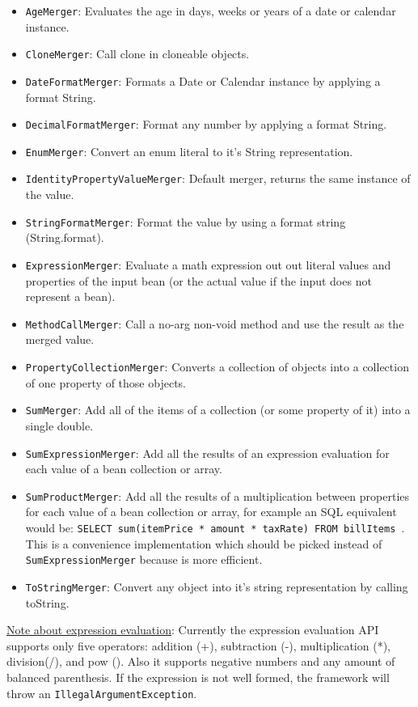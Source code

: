 \documentclass[11pt]{article}
\begin{document}
\begin{itemize}
 \item \texttt{AgeMerger}: Evaluates the age in days, weeks or years of a date or calendar instance.
 \item \texttt{CloneMerger}: Call clone in cloneable objects.
 \item \texttt{DateFormatMerger}: Formats a Date or Calendar instance by applying a format String.
 \item \texttt{DecimalFormatMerger}: Format any number by applying a format String.
 \item \texttt{EnumMerger}: Convert an enum literal to it's String representation.
 \item \texttt{IdentityPropertyValueMerger}: Default merger, returns the same instance of the value.
 \item \texttt{StringFormatMerger}: Format the value by using a format string (String.format).
 \item \texttt{ExpressionMerger}: Evaluate a math expression out out literal values and properties of the input bean (or the actual value if the input does not represent a bean).
 \item \texttt{MethodCallMerger}: Call a no-arg non-void method and use the result as the merged value.
 \item \texttt{PropertyCollectionMerger}: Converts a collection of objects into a collection of one property of those objects.
 \item \texttt{SumMerger}: Add all of the items of a collection (or some property of it) into a single double.
 \item \texttt{SumExpressionMerger}: Add all the results of an expression evaluation for each value of a bean collection or array.
 \item \texttt{SumProductMerger}: Add all the results of a multiplication between properties for each value of a bean collection or array, for example an SQL equivalent would be: \texttt{SELECT sum(itemPrice * amount * taxRate) FROM billItems }. This is a convenience implementation which should be picked instead of \texttt{SumExpressionMerger} because is more efficient.
 \item \texttt{ToStringMerger}: Convert any object into it's string representation by calling toString.
\end{itemize}

\underline{Note about expression evaluation}: Currently the expression evaluation API supports only five operators: addition (+), subtraction (-), multiplication (*), division(/), and pow (). Also it supports negative numbers and any amount of balanced parenthesis. If the expression is not well formed, the framework will throw an \texttt{IllegalArgumentException}.
\end{document}
